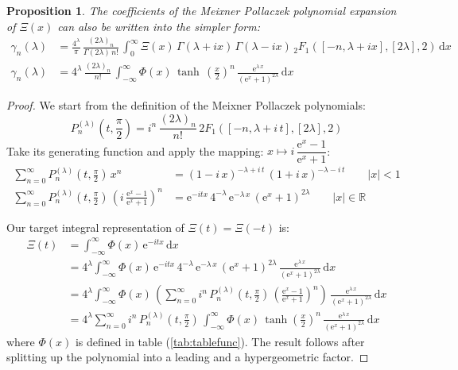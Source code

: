 \documentclass[a4paper,11pt,twoside]{amsart}
\newtheorem{proposition}[theorem]{Proposition}
\newcommand{\verifiedeq}{=}
\newcommand{\defeq}{=}
\newcommand{\verifiedeq}{\stackrel{\checkmark}{=}}
\newcommand{\defeq}{\stackrel{\scriptscriptstyle \textnormal{def}}{=}}
\begin{document}
\begin{proposition}
The coefficients of the Meixner Pollaczek polynomial expansion of $\Xi(x)$ can also be written into the simpler form:   
\begin{align}
\gamma_n(\lambda) &\verifiedeq \frac{4^\lambda}{\pi}\,\frac{(2\lambda)_n}{\Gamma(2\lambda)\,n!}\,\int_{0}^{\infty} \Xi(x)\,\Gamma(\lambda+ix)\,\Gamma(\lambda-ix)\,{}_2F_1([-n,\lambda+ix],[2\lambda],2)\,\mathrm{d}x \\
\gamma_n(\lambda) &\verifiedeq 4^\lambda\,\frac{(2\lambda)_n}{n!}\,\int_{-\infty}^{\infty} \Phi(x)\,\tanh\,\left(\frac{x}{2}\right)^n\,\frac{\textrm{e}^{\lambda\,x}}{(\textrm{e}^x+1)^{2\lambda}}\,\mathrm{d}x
\end{align}
\end{proposition}
\begin{proof}
We start from the definition of the Meixner Pollaczek polynomials:
\begin{equation}
  P_n^{(\lambda)}\left(t,\frac{\pi}{2}\right) \defeq i^n\,\frac{(2\lambda)_n}{n!}\,{}2F_1\left([-n, \lambda+i\,t],[2\lambda],2\right)
\end{equation}
Take its generating function and apply the mapping: $x \mapsto i\,\dfrac{\textrm{e}^x-1}{\textrm{e}^x+1}$:
\begin{align}
 \sum_{n=0}^\infty P_n^{(\lambda)}\left(t,\frac{\pi}{2}\right)\,x^n &\verifiedeq (1-i\,x)^{-\lambda+i\,t}\,(1+i\,x)^{-\lambda-i\,t} \qquad |x| < 1 \\
 \sum_{n=0}^\infty P_n^{(\lambda)}\left(t,\frac{\pi}{2}\right)\,\left(i\,\frac{\textrm{e}^x-1}{\textrm{e}^x+1}\right)^n &\verifiedeq \textrm{e}^{-itx}\,4^{-\lambda}\, \textrm{e}^{-\lambda\,x}\,(\textrm{e}^x+1)^{2\lambda} \qquad |x| \in \mathbb{R}
\end{align}

Our target integral representation of $\Xi(t) = \Xi(-t)$ is:
\begin{align}
 \Xi(t) &\verifiedeq \int_{-\infty}^\infty \Phi(x)\,\textrm{e}^{-itx}\, \mathrm{d}x \\
 &\verifiedeq 4^\lambda \int_{-\infty}^\infty \Phi(x)\,\textrm{e}^{-itx}\,4^{-\lambda}\, \textrm{e}^{-\lambda\,x}\,(\textrm{e}^x+1)^{2\lambda}\,\frac{\textrm{e}^{\lambda\,x}}{(\textrm{e}^x+1)^{2\lambda}} \,\mathrm{d}x \\
 &\verifiedeq 4^\lambda \int_{-\infty}^\infty \Phi(x)\,\left(\sum_{n=0}^\infty i^n\,P_n^{(\lambda)}\left(t,\frac{\pi}{2}\right)\,\left(\frac{\textrm{e}^x-1}{\textrm{e}^x+1}\right)^n\right)\,\frac{\textrm{e}^{\lambda\,x}}{(\textrm{e}^x+1)^{2\lambda}} \, \mathrm{d}x \\
 &\verifiedeq 4^\lambda \sum_{n=0}^\infty i^n\,P_n^{(\lambda)}\left(t,\frac{\pi}{2}\right)\,\int_{-\infty}^\infty \Phi(x)\,\tanh\left(\frac{x}{2}\right)^n\,\frac{\textrm{e}^{\lambda\,x}}{(\textrm{e}^x+1)^{2\lambda}}\, \mathrm{d}x \label{meixner}
\end{align}
where $\Phi(x)$ is defined in table (\ref{tab:tablefunc}). The result follows after splitting up the polynomial into a leading and a hypergeometric factor.
\end{proof}
\end{document}
